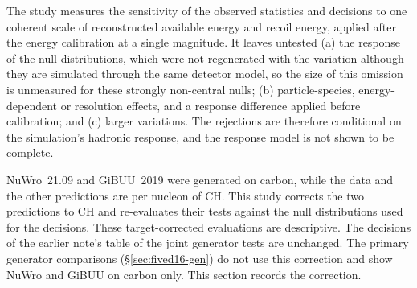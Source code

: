 The study measures the sensitivity of the observed statistics and decisions to one coherent scale of reconstructed available energy and recoil energy, applied after the energy calibration at a single magnitude. It leaves untested (a) the response of the null distributions, which were not regenerated with the variation although they are simulated through the same detector model, so the size of this omission is unmeasured for these strongly non-central nulls; (b) particle-species, energy-dependent or resolution effects, and a response difference applied before calibration; and (c) larger variations. The rejections are therefore conditional on the simulation's hadronic response, and the response model is not shown to be complete.

NuWro~21.09 and GiBUU~2019 were generated on carbon, while the data and the other predictions are per nucleon of CH. This study corrects the two predictions to CH and re-evaluates their tests against the null distributions used for the decisions. These target-corrected evaluations are descriptive. The decisions of the earlier note's table of the joint generator tests are unchanged. The primary generator comparisons (\S\ref{sec:fived16-gen}) do not use this correction and show NuWro and GiBUU on carbon only. This section records the correction.

